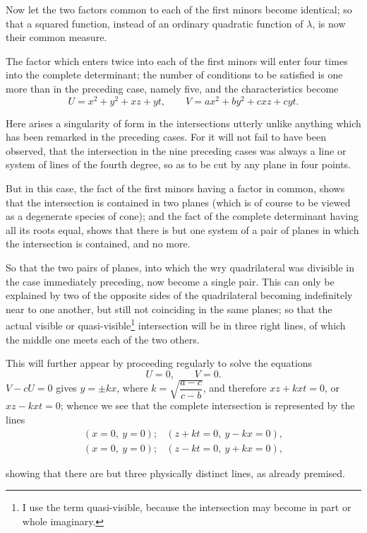 \documentclass[11pt]{article}
\newcommand{\sourcepage}[1]{\marginpar{\scriptsize p.~#1}}
\begin{document}
{{Now let the two factors common to each of the first minors become identical; so that a squared function, instead of an ordinary quadratic function of $\lambda$, is now their common measure.

The factor which enters twice into each of the first minors will enter four times into the complete determinant; the number of conditions to be satisfied is one more than in the preceding case, namely five, and the characteristics become
\[
U=x^2+y^2+xz+yt,
\qquad
V=ax^2+by^2+cxz+cyt.
\]

Here arises a singularity of form in the intersections utterly unlike anything which has been remarked in the preceding cases. For it will not fail to have been observed, that the intersection in the nine preceding cases was always a line or system of lines of the fourth degree, so as to be cut by any plane in four points.

But in this case, the fact of the first minors having a factor in common, shows that the intersection is contained in two planes (which is of course to be viewed as a degenerate species of cone); and the fact of the complete determinant having all its roots equal, shows that there is but one system of a pair of planes in which the intersection is contained, and no more.

So that the two pairs of planes, into which the wry quadrilateral was divisible in the case immediately preceding, now become a single pair. This can only be explained by two of the opposite sides of the quadrilateral becoming indefinitely near to one another, but still not coinciding in the same planes; so that the actual visible or quasi-visible\footnote{I use the term quasi-visible, because the intersection may become in part or whole imaginary.} intersection will be in three right lines, of which the middle one meets each of the two others.

This will further appear by proceeding regularly to solve the equations
\[
U=0,
\qquad
V=0.
\]
$V-cU=0$ gives $y=\pm kx$, where $k=\sqrt{\dfrac{a-c}{c-b}}$, and therefore $xz+kxt=0$, or $xz-kxt=0$; whence we see that the complete intersection is represented by the lines
\[
\begin{array}{ll}
(x=0,\ y=0); & (z+kt=0,\ y-kx=0),\\
(x=0,\ y=0); & (z-kt=0,\ y+kx=0),
\end{array}
\]

\sourcepage{234}
showing that there are but three physically distinct lines, as already premised.

}}
\end{document}
